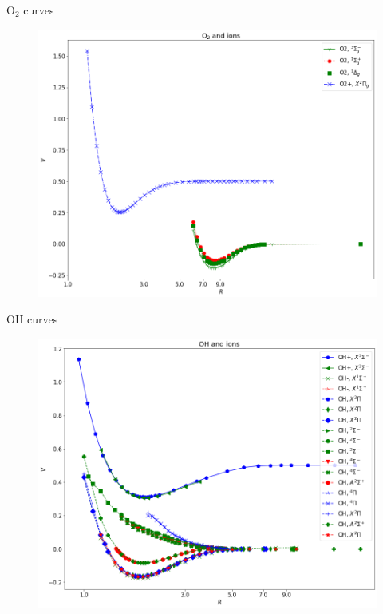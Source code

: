 \documentclass{beamer}
\begin{document}
\begin{frame}{O$_2$ curves}
    \begin{figure}[h]
        \centering
        \includegraphics[scale=0.27]{img/O2_and_ions.png}
        \label{fig:o2}
    \end{figure}
\end{frame}
\begin{frame}{OH curves}
    \begin{figure}[h]
        \centering
        \includegraphics[scale=0.27]{img/OH_and_ions.png}
        \label{fig:oh}
    \end{figure}
\end{frame}
\end{document}
